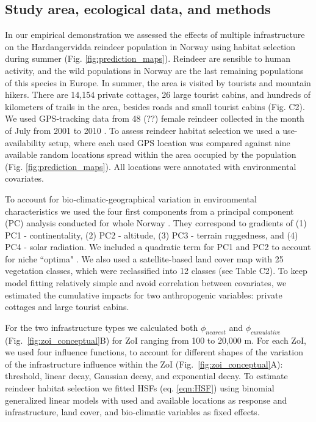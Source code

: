 \documentclass[titlepage]{article}
\begin{document}
{\subsection{Study area, ecological data, and methods}

In our empirical demonstration we assessed the effects of multiple infrastructure on the Hardangervidda reindeer population in Norway using habitat selection during summer (Fig. \ref{fig:prediction_maps}). Reindeer are sensible to human activity, and the wild populations in Norway are the last remaining populations of this species in Europe. In summer, the area is visited by tourists and mountain hikers. There are 14,154 private cottages, 26 large tourist cabins, and hundreds of kilometers of trails in the area, besides roads and small tourist cabins (Fig. C2). We used GPS-tracking data from 48 (??) female reindeer collected in the month of July from 2001 to 2010 \citep[see][for further details]{panzacchi_searching_2015}. To assess reindeer habitat selection we used a use-availability setup, where each used GPS location was compared against nine available random locations spread within the area occupied by the population (Fig. \ref{fig:prediction_maps}). All locations were annotated with environmental covariates.

To account for bio-climatic-geographical variation in environmental characteristics we used the four first components from a principal component (PC) analysis conducted for whole Norway \citep{bakkestuen_step-less_2008}. They correspond to gradients of (1) PC1 - continentality, (2) PC2 - altitude, (3) PC3 - terrain ruggedness, and (4) PC4 - solar radiation. We included a quadratic term for PC1 and PC2 to account for niche ``optima" \citep[\textit{sensu}][]{panzacchi_searching_2015}. We also used a satellite-based land cover map with 25 vegetation classes, which were reclassified into 12 classes (see Table C2). To keep model fitting relatively simple and avoid correlation between covariates, we estimated the cumulative impacts for two anthropogenic variables: private cottages and large tourist cabins.

For the two infrastructure types we calculated both $\phi_{nearest}$ and $\phi_{cumulative}$ (Fig.~\ref{fig:zoi_conceptual}B) for ZoI ranging from 100 to 20,000 m. For each ZoI, we used four influence functions, to account for different shapes of the variation of the infrastructure influence within the ZoI (Fig.~\ref{fig:zoi_conceptual}A): threshold, linear decay, Gaussian decay, and exponential decay. To estimate reindeer habitat selection we fitted HSFs (eq. \ref{eqn:HSF}) using binomial generalized linear models \citep{fieberg_how_2021} with used and available locations as response and infrastructure, land cover, and bio-climatic variables as fixed effects. 

}
\end{document}

